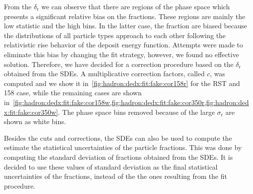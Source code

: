 From the $\delta_\text{r}$ we can observe that there are regions
of the phase space which presents a significant relative
bias on the fractions.
These regions are mainly the low statistic and the high \pp
bins. In the latter case, the fraction are biased because
the \dedx distributions of all particle types
approach to each other following the relativistic rise
behavior of the deposit energy function.
Attempts were made to eliminate this bias
by changing the fit strategy, however, we found no effective solution.
Therefore, we have decided for a correction procedure based on
the $\delta_\text{r}$ obtained from the SDEs.
A multiplicative correction factors, called $c$, was computed
and we show it 
in~\cref{fig:hadron:dedx:fit:fake:cor158r} for the RST and 158 \GeVc case,
while the remaining cases are shown
in~\cref{fig:hadron:dedx:fit:fake:cor158w,fig:hadron:dedx:fit:fake:cor350r,fig:hadron:dedx:fit:fake:cor350w}.
The phase space bins removed because of the large $\sigma_\text{r}$ are shown
as white bins.

Besides the cuts and corrections, the SDEs can also
be used to compute the estimate the statistical uncertainties
of the particle fractions.
This was done by computing the standard deviation of
fractions obtained from the SDEs.
It is decided to use these values of standard deviation
as the final statistical uncertainties of the fractions,
instead of the the ones resulting from the fit procedure.

